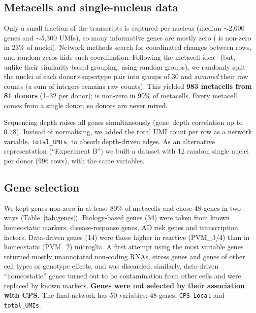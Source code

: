 \subsection{Metacells and single-nucleus data}
Only a small fraction of the transcripts is captured per nucleus (median $\sim$2{,}600 genes and $\sim$5{,}300 UMIs), so many informative genes are mostly zero ( is non-zero in 23\% of nuclei). Network methods search for coordinated changes between rows, and random zeros hide such coordination. Following the metacell idea~\cite{Baran2019,Morabito2023} (but, unlike their similarity-based grouping, using random groups), we randomly split the nuclei of each donor$\times$supertype pair into groups of 30 and \emph{summed} their raw counts (a sum of integers remains raw counts). This yielded \textbf{983 metacells from 81 donors} (1--32 per donor);  is non-zero in 99\% of metacells. Every metacell comes from a single donor, so donors are never mixed.

Sequencing depth raises all genes simultaneously (gene--depth correlation up to 0.78). Instead of normalising, we added the total UMI count per row as a network variable, \texttt{total\_UMIs}, to absorb depth-driven edges. As an alternative representation (``Experiment B'') we built a dataset with 12 random single nuclei per donor (996 rows), with the same variables.

\subsection{Gene selection}
We kept genes non-zero in at least 80\% of metacells and chose 48 genes in two ways (Table~\ref{tab:genes}). Biology-based genes (34) were taken from known homeostatic markers, disease-response genes, AD risk genes and transcription factors. Data-driven genes (14) were those higher in reactive (PVM\_3/4) than in homeostatic (PVM\_2) microglia. A first attempt using the most variable genes returned mostly unannotated non-coding RNAs, stress genes and genes of other cell types or genotype effects, and was discarded; similarly, data-driven ``homeostatic'' genes turned out to be contamination from other cells and were replaced by known markers. \textbf{Genes were not selected by their association with CPS.} The final network has 50 variables: 48 genes, \texttt{CPS\_Local} and \texttt{total\_UMIs}.

